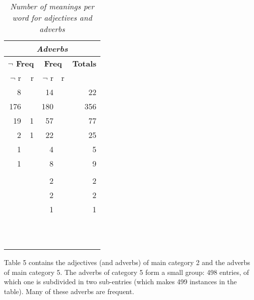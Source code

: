 \begin{table}[htb]
\begin{tabular}{r|r|r|r|r|}\hline
 \multicolumn{5}{c|}{\em Adverbs}\\ \hline
 \multicolumn{2}{c|}{\bf $\neg$ Freq} &\multicolumn{2}{c|}{\bf Freq}
     & {\bf Totals}\\ \cline{1-4}
 $\neg$ r&      r&$\neg$ r&      r&     \\ \hline\hline
        8&       &     14&        &   22\\ \hline
      176&       &    180&        &  356\\ \hline
       19&      1&     57&        &   77\\ \hline
        2&      1&     22&        &   25\\ \hline
        1&       &      4&        &    5\\ \hline
        1&       &      8&        &    9\\ \hline
         &       &       &        &     \\ \hline
         &       &      2&        &    2\\ \hline
         &       &      2&        &    2\\ \hline
         &       &      1&        &    1\\ \hline
         &       &       &        &     \\ \hline
         &       &       &        &     \\ \hline
         &       &       &        &     \\ \hline
         &       &       &        &     \\ \hline
         &       &       &        &     \\ \hline
         &       &       &        &     \\ \hline
         &       &       &        &     \\ \hline
         &       &       &        &     \\ \hline
         &       &       &        &     \\ \hline
         &       &       &        &     \\ \hline
         &       &       &        &     \\ \hline
\end{tabular}
\caption{{\em Number of meanings per word for adjectives and adverbs}} 
\end{table}

Table 5 contains the adjectives (and adverbs) of main category 2 and the
adverbs of main category 5.
The adverbs of category 5 form a small group: 498 entries, of which one is 
subdivided in two sub-entries 
(which makes 499 instances in the table). Many of these
adverbs are frequent. 

